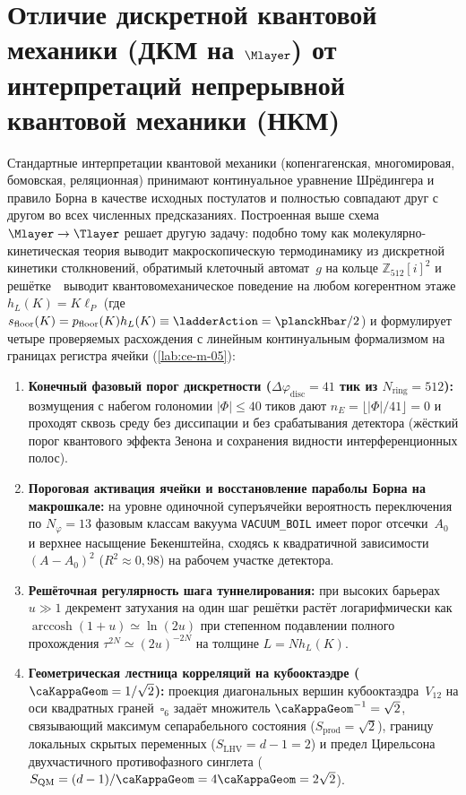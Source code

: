 \section{Отличие дискретной квантовой механики (ДКМ на \texorpdfstring{$\Mlayer$}{M}) от интерпретаций непрерывной квантовой механики (НКМ)}
\label{sec:macro-qm-mechanics-vs-interpretations}

Стандартные интерпретации квантовой механики (копенгагенская, многомировая, бомовская, реляционная) принимают континуальное уравнение Шрёдингера и правило Борна в качестве исходных постулатов и полностью совпадают друг с другом во всех численных предсказаниях.
Построенная выше схема $\Mlayer\to\Tlayer$ решает другую задачу: подобно тому как молекулярно-кинетическая теория выводит макроскопическую термодинамику из дискретной кинетики столкновений, обратимый клеточный автомат~$g$ на кольце $\mathbb{Z}_{512}[i]^2$ и решётке~\latGCKshort\ выводит квантовомеханическое поведение на любом когерентном этаже $h_L(K) = K\ell_P$ (где $s_{\mathrm{floor}}(K) = p_{\mathrm{floor}}(K)h_L(K) \equiv \ladderAction = \planckHbar/2$) и формулирует четыре проверяемых расхождения с линейным континуальным формализмом на границах регистра ячейки (\cref{lab:ce-m-05}):
\begin{enumerate}[leftmargin=*,noitemsep]
\item \textbf{Конечный фазовый порог дискретности ($\Delta\varphi_{\mathrm{disc}} = 41$ тик из $N_{\mathrm{ring}} = 512$):}
  возмущения с набегом голономии $|\Phi| \le 40$ тиков дают $n_E = \lfloor|\Phi|/41\rfloor = 0$ и проходят сквозь среду без диссипации и без срабатывания детектора (жёсткий порог квантового эффекта Зенона и сохранения видности интерференционных полос).
\item \textbf{Пороговая активация ячейки и восстановление параболы Борна на макрошкале:}
  на уровне одиночной суперъячейки вероятность переключения по $N_\varphi = 13$ фазовым классам вакуума \texttt{VACUUM\_BOIL} имеет порог отсечки~$A_0$ и верхнее насыщение Бекенштейна, сходясь к квадратичной зависимости $(A - A_0)^2$ ($R^2 \approx 0{,}98$) на рабочем участке детектора.
\item \textbf{Решёточная регулярность шага туннелирования:}
  при высоких барьерах $u \gg 1$ декремент затухания на один шаг решётки растёт логарифмически как $\operatorname{arccosh}(1+u) \simeq \ln(2u)$ при степенном подавлении полного прохождения $\tau^{2N} \simeq (2u)^{-2N}$ на толщине $L = Nh_L(K)$.
\item \textbf{Геометрическая лестница корреляций на кубооктаэдре ($\caKappaGeom = 1/\sqrt{2}$):}
  проекция диагональных вершин кубооктаэдра~$V_{12}$ на оси квадратных граней~$\square_6$ задаёт множитель $\caKappaGeom^{-1} = \sqrt{2}$, связывающий максимум сепарабельного состояния ($S_{\mathrm{prod}} = \sqrt{2}$), границу локальных скрытых переменных ($S_{\mathrm{LHV}} = d-1 = 2$) и предел Цирельсона двухчастичного противофазного синглета ($S_{\mathrm{QM}} = (d-1)/\caKappaGeom = 4\caKappaGeom = 2\sqrt{2}$).
\end{enumerate}
